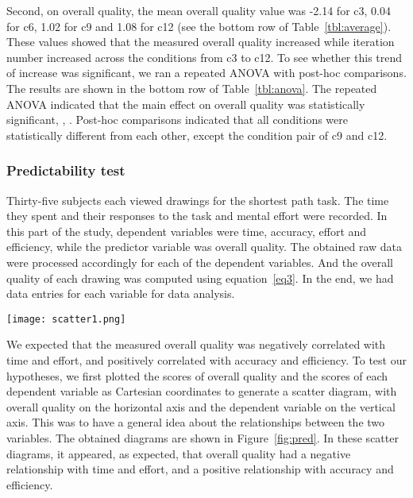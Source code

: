 \documentclass[conference,letterpaper]{IEEEtran}
\begin{document}
Second, on overall quality, the mean overall quality value was -2.14 for c3, 0.04 for c6, 1.02 for c9 and 1.08 for c12 (see the bottom row of Table~\ref{tbl:average}). These values showed that the measured overall quality increased while iteration number increased across the conditions from c3 to c12. To see whether this trend of increase was significant, we ran a repeated ANOVA with post-hoc comparisons. The results are shown in the bottom row of Table~\ref{tbl:anova}. The repeated ANOVA indicated that the main effect on overall quality was statistically significant, , . Post-hoc comparisons indicated that all conditions were statistically different from each other, except the condition pair of c9 and c12. 


\subsubsection{Predictability test}

Thirty-five subjects each viewed  drawings for the shortest path task. The time they spent and their responses to the task and mental effort were recorded. In this part of the study, dependent variables were time, accuracy, effort and efficiency, while the predictor variable was overall quality. The obtained raw data were processed accordingly for each of the dependent variables. And the overall quality of each drawing was computed using equation~\ref{eq3}. In the end, we had  data entries for each variable for data analysis. 



 \begin{figure*}[t]
\centering
\texttt{[image: scatter1.png]}
\caption{Scatter diagrams between dependent variables and overall quality} 
\label{fig:pred}
\end{figure*}



We expected that the measured overall quality was negatively correlated with time and effort, and positively correlated with accuracy and efficiency. To test our hypotheses, we first plotted the scores of overall quality and the scores of each dependent variable as Cartesian coordinates to generate a scatter diagram, with overall quality on the horizontal axis and the dependent variable on the vertical axis. This was to have a general idea about the relationships between the two variables. The obtained diagrams are shown in Figure~\ref{fig:pred}. In these scatter diagrams, it appeared, as expected, that overall quality had a negative relationship with time and effort, and a positive relationship with accuracy and efficiency.
\end{document}
